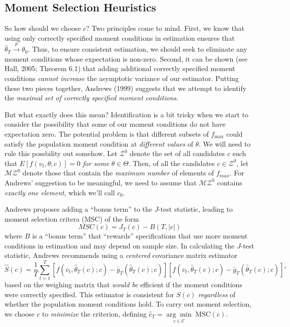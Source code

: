 \subsection{Moment Selection Heuristics}
So how should we choose $c$? Two principles come to mind. First, we know that using only correctly specified moment conditions in estimation ensures that $\widehat{\theta}_T \overset{p}{\rightarrow} \theta_0$. Thus, to ensure consistent estimation, we should seek to eliminate any moment conditions whose expectation is non-zero. Second, it can be shown (see Hall, 2005; Theorem 6.1) that adding additional correctly specified moment conditions \emph{cannot increase} the asymptotic variance of our estimator. Putting these two pieces together, Andrews (1999) suggests that we attempt to identify the \emph{maximal set of correctly specified moment conditions}.

But what exactly does this mean? Identification is a bit tricky when we start to consider the possibility that some of our moment conditions do not have expectation zero. The potential problem is that different subsets of $f_{\max}$ could satisfy the population moment condition at \emph{different values} of $\theta$. We will need to rule this possbility out somehow. Let $\mathcal{Z}^0$ denote the set of all candidates $c$ such that $E[f(v_t, \theta; c)] = 0$ \emph{for some} $\theta\in \Theta$. Then, of all the candidates $c\in \mathcal{Z}^0$, let $\mathcal{MZ}^0$ denote those that contain the \emph{maximum number} of elements of $f_{max}$. For Andrews' suggestion to be meaningful, we need to assume that $\mathcal{MZ}^0$ contains \emph{exactly one element}, which we'll call $c_0$.

Andrews proposes adding a ``bonus term'' to the $J$-test statistic, leading to moment selection critera (MSC) of the form
	$$MSC(c) = J_T(c) - B(T, |c|)$$
where $B$ is a ``bonus term'' that ``rewards'' specifications that use more moment conditions in estimation and may depend on sample size. In calculating the $J$-test statistic, Andrews recommends using a \emph{centered} covariance matrix estimator
	$$\widehat{S}(c) = \frac{1}{T} \sum_{t=1}^T \left[f(v_t, \widehat{\theta}_T(c);c) - \bar{g}_T(\widehat{\theta}_T(c); c) \right]\left[f(v_t, \widehat{\theta}_T(c);c) - \bar{g}_T(\widehat{\theta}_T(c); c) \right]'$$
based on the weighing matrix that \emph{would be} efficient if the moment conditions were correctly specified. This estimator is consistent for $S(c)$ \emph{regardless} of whether the population moment conditions hold. To carry out moment selection, we choose $c$ to \emph{minimize} the criterion, defining $\widehat{c}_T = \underset{c\in\mathcal{C}}{\arg\min} \;\mbox{MSC}(c)$.



